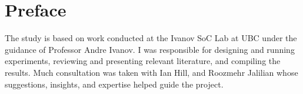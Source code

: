 \chapter{Preface}


The study is based on work conducted at the Ivanov SoC Lab at UBC under the guidance of Professor Andre Ivanov. I was responsible for designing and running experiments, reviewing and presenting relevant literature, and compiling the results. Much consultation was taken with Ian Hill, and Roozmehr Jalilian whose suggestions, insights, and expertise helped guide the project.
